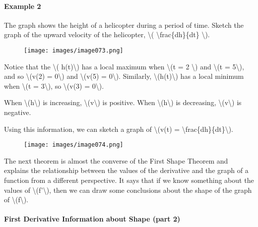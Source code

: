 \hypertarget{example-2}{%
\paragraph{Example 2}\label{example-2}}

The graph shows the height of a helicopter during a period of time.
Sketch the graph of the upward velocity of the helicopter,
\textbackslash{}( \textbackslash{}frac\{dh\}\{dt\} \textbackslash{}).

\begin{figure}
\centering
\texttt{[image: images/image073.png]}
\caption{}
\end{figure}

Notice that the \textbackslash{}( h(t)\textbackslash{}) has a local
maximum when \textbackslash{}(t = 2 \textbackslash{}) and
\textbackslash{}(t = 5\textbackslash{}), and so \textbackslash{}(v(2) =
0\textbackslash{}) and \textbackslash{}(v(5) = 0\textbackslash{}).
Similarly, \textbackslash{}(h(t)\textbackslash{}) has a local minimum
when \textbackslash{}(t = 3\textbackslash{}), so \textbackslash{}(v(3) =
0\textbackslash{}).

When \textbackslash{}(h\textbackslash{}) is increasing,
\textbackslash{}(v\textbackslash{}) is positive. When
\textbackslash{}(h\textbackslash{}) is decreasing,
\textbackslash{}(v\textbackslash{}) is negative.

Using this information, we can sketch a graph of \textbackslash{}(v(t) =
\textbackslash{}frac\{dh\}\{dt\}\textbackslash{}).

\begin{figure}
\centering
\texttt{[image: images/image074.png]}
\caption{}
\end{figure}

The next theorem is almost the converse of the First Shape Theorem and
explains the relationship between the values of the derivative and the
graph of a function from a different perspective. It says that if we
know something about the values of \textbackslash{}(f'\textbackslash{}),
then we can draw some conclusions about the shape of the graph of
\textbackslash{}(f\textbackslash{}).

\hypertarget{first-derivative-information-about-shape-part-2}{%
\paragraph{First Derivative Information about Shape (part
2)}\label{first-derivative-information-about-shape-part-2}}

